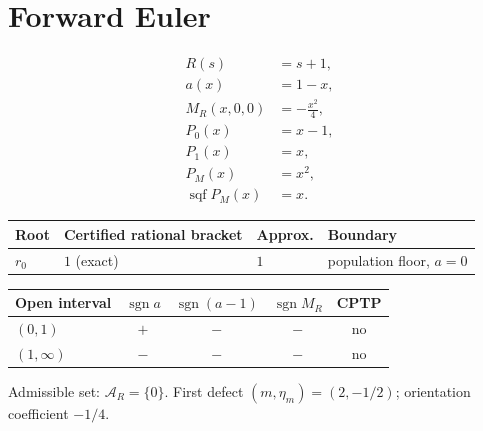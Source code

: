 \documentclass[11pt]{article}
\begin{document}
\section{Forward Euler}
\begin{align*}
R(s)&=s + 1,\\
a(x)&=1 - x,\\
M_R(x,0,0)&=- \frac{x^{2}}{4},\\
P_0(x)&=x-1,\\
P_1(x)&=x,\\
P_M(x)&=x^{2},\\
\operatorname{sqf}P_M(x)&=x.
\end{align*}
\begin{center}
\begin{tabular}{@{}llll@{}}
\toprule
Root & Certified rational bracket & Approx. & Boundary \\
\midrule
$r_0$ & $1$ (exact) & $1$ & population floor, $a=0$ \\
\bottomrule
\end{tabular}
\end{center}
\begin{center}
\begin{tabular}{@{}lcccc@{}}
\toprule
Open interval & $\operatorname{sgn}a$ & $\operatorname{sgn}(a-1)$ & $\operatorname{sgn}M_R$ & CPTP \\
\midrule
$(0,1)$ & $+$ & $-$ & $-$ & no \\
$(1,\infty)$ & $-$ & $-$ & $-$ & no \\
\bottomrule
\end{tabular}
\end{center}
Admissible set: $\mathcal A_R=\{0\}$. First defect $(m,\eta_m)=(2,-1/2)$; orientation coefficient $-1/4$.
\end{document}
